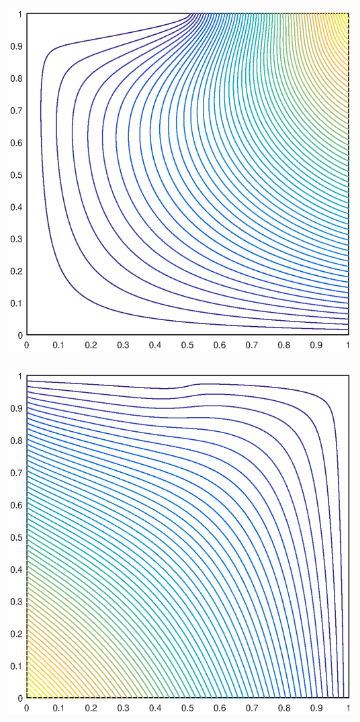 \begin{figure}
\begin{subfigure}[b]{0.35\textwidth}
		\caption{}
	\end{subfigure}
	\hspace{1cm}
	\begin{subfigure}[b]{0.35\textwidth}
		\centering
		\includegraphics[width=\textwidth]{figures/sec_BF/deg_square_MAXENT1_contour_b3.eps}
		\caption{}
	\end{subfigure}
	\vfill
	\begin{subfigure}[b]{0.35\textwidth}
		\centering
		\includegraphics[width=\textwidth]{figures/sec_BF/deg_square_MAXENT1_contour_b1.eps}

\end{subfigure}
\end{figure}
